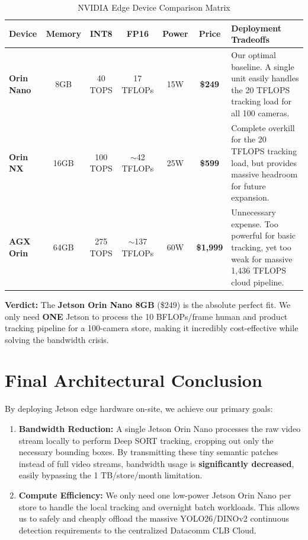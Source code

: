 \documentclass[12pt,a4paper]{article}
\begin{document}
\begin{table}[h!]
\centering
\scriptsize
\begin{tabularx}{\textwidth}{l c c c c c X}
\toprule
\textbf{Device} & \textbf{Memory} & \textbf{INT8} & \textbf{FP16} & \textbf{Power} & \textbf{Price} & \textbf{Deployment Tradeoffs} \\
\midrule
\textbf{Orin Nano} & 8GB & 40 TOPS & 17 TFLOPs & 15W & \textbf{\$249} & Our optimal baseline. A single unit easily handles the 20 TFLOPS tracking load for all 100 cameras. \\
\addlinespace
\textbf{Orin NX} & 16GB & 100 TOPS & $\sim$42 TFLOPs & 25W & \textbf{\$599} & Complete overkill for the 20 TFLOPS tracking load, but provides massive headroom for future expansion. \\
\addlinespace
\textbf{AGX Orin} & 64GB & 275 TOPS & $\sim$137 TFLOPs & 60W & \textbf{\$1,999} & Unnecessary expense. Too powerful for basic tracking, yet too weak for massive 1,436 TFLOPS cloud pipeline. \\
\bottomrule
\end{tabularx}
\caption{NVIDIA Edge Device Comparison Matrix}
\end{table}

\textbf{Verdict:} The \textbf{Jetson Orin Nano 8GB} (\$249) is the absolute perfect fit. We only need \textbf{ONE} Jetson to process the 10 BFLOPs/frame human and product tracking pipeline for a 100-camera store, making it incredibly cost-effective while solving the bandwidth crisis.

\section{Final Architectural Conclusion}
By deploying Jetson edge hardware on-site, we achieve our primary goals:
\begin{enumerate}
    \item \textbf{Bandwidth Reduction:} A single Jetson Orin Nano processes the raw video stream locally to perform Deep SORT tracking, cropping out only the necessary bounding boxes. By transmitting these tiny semantic patches instead of full video streams, bandwidth usage is \textbf{significantly decreased}, easily bypassing the 1 TB/store/month limitation.
    \item \textbf{Compute Efficiency:} We only need one low-power Jetson Orin Nano per store to handle the local tracking and overnight batch workloads. This allows us to safely and cheaply offload the massive YOLO26/DINOv2 continuous detection requirements to the centralized Datacomm CLB Cloud.
\end{enumerate}
\end{document}

